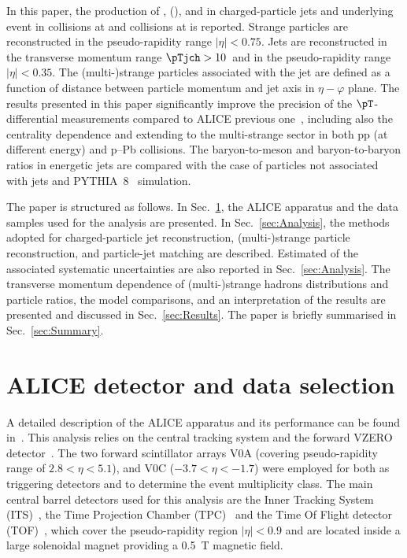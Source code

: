 \documentclass[ALICE,manyauthors]{cernphprep}
\begin{document}
In this paper, the production of \kzero, \lmb (\almb), \Xis and \Oms in charged-particle jets and underlying event in \pp collisions at \thirteen and \pPb collisions at \fivenn is reported.
Strange particles are reconstructed in the pseudo-rapidity range $|\eta| < 0.75$.
Jets are reconstructed in the transverse momentum range $\pTjch > 10$~\GeVc and in the pseudo-rapidity range $|\eta| < 0.35$.
The (multi-)strange particles associated with the jet are defined as a function of distance between particle momentum and jet axis in $\eta-\varphi$ plane.
The results presented in this paper significantly improve the precision of the $\pT$-differential measurements  compared to ALICE previous one~\cite{Acharya:2021oaa}, including also the centrality dependence and extending to the multi-strange sector in both pp (at different energy) and p–Pb collisions.
The baryon-to-meson and baryon-to-baryon ratios in energetic jets are compared with the case of particles not associated with jets and PYTHIA~8~\cite{Sjostrand:2014zea} simulation.

The paper is structured as follows.
In Sec.~\ref{sec:Detector}, the ALICE apparatus and the data samples used for the analysis are presented. In Sec.~\ref{sec:Analysis}, the methods adopted for charged-particle jet reconstruction, (multi-)strange particle reconstruction, and particle-jet matching are described.
Estimated of the associated systematic uncertainties are also reported in Sec.~\ref{sec:Analysis}.
The transverse momentum dependence of (multi-)strange hadrons distributions and particle ratios, the model comparisons, and an interpretation of the results are presented and discussed in Sec.~\ref{sec:Results}. The paper is briefly summarised in Sec.~\ref{sec:Summary}.

\section{ALICE detector and data selection}%
\label{sec:Detector}

A detailed description of the ALICE apparatus and its performance can be found in~\cite{Collaboration_2008, Abelev:2014ffa}.
This analysis relies on the central tracking system and the forward VZERO detector~\cite{Abbas:2013taa}.
The two forward scintillator arrays V0A (covering pseudo-rapidity range of $2.8 < \eta < 5.1$), and V0C ($-3.7 < \eta < -1.7$) were employed for both as triggering detectors and to determine the event multiplicity class.
The main central barrel detectors used for this analysis are the Inner Tracking System (ITS)~\cite{Aamodt:2010aa}, the Time Projection Chamber (TPC)~\cite{Alme:2010ke} and the Time Of Flight detector (TOF)~\cite{Akindinov:2004cj, Akindinov:2009zze, Akindinov:2010zzb, Carnesecchi:2018oss}, which cover the pseudo-rapidity region $|\eta| < 0.9$ and are located inside a large solenoidal magnet providing a 0.5~T magnetic field.
\end{document}
